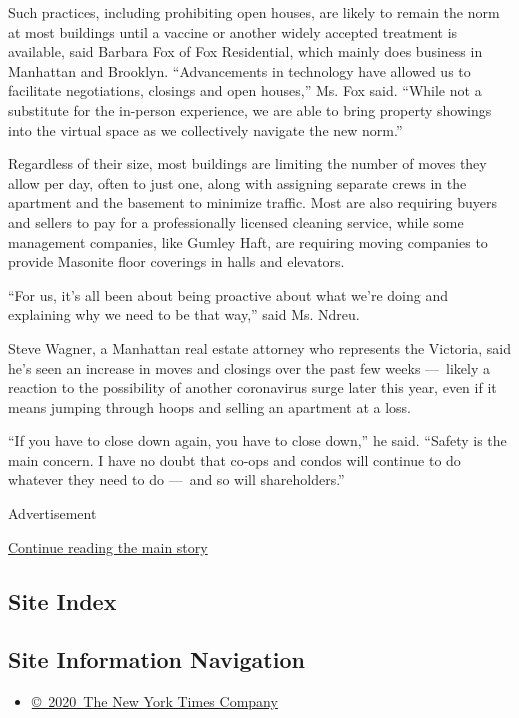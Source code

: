 Such practices, including prohibiting open houses, are likely to remain
the norm at most buildings until a vaccine or another widely accepted
treatment is available, said Barbara Fox of Fox Residential, which
mainly does business in Manhattan and Brooklyn. ``Advancements in
technology have allowed us to facilitate negotiations, closings and open
houses,'' Ms. Fox said. ``While not a substitute for the in-person
experience, we are able to bring property showings into the virtual
space as we collectively navigate the new norm.''

Regardless of their size, most buildings are limiting the number of
moves they allow per day, often to just one, along with assigning
separate crews in the apartment and the basement to minimize traffic.
Most are also requiring buyers and sellers to pay for a professionally
licensed cleaning service, while some management companies, like Gumley
Haft, are requiring moving companies to provide Masonite floor coverings
in halls and elevators.

``For us, it's all been about being proactive about what we're doing and
explaining why we need to be that way,'' said Ms. Ndreu.

Steve Wagner, a Manhattan real estate attorney who represents the
Victoria, said he's seen an increase in moves and closings over the past
few weeks ---~likely a reaction to the possibility of another
coronavirus surge later this year, even if it means jumping through
hoops and selling an apartment at a loss.

``If you have to close down again, you have to close down,'' he said.
``Safety is the main concern. I have no doubt that co-ops and condos
will continue to do whatever they need to do ---~and so will
shareholders.''

Advertisement

\protect\hyperlink{after-bottom}{Continue reading the main story}

\hypertarget{site-index}{%
\subsection{Site Index}\label{site-index}}

\hypertarget{site-information-navigation}{%
\subsection{Site Information
Navigation}\label{site-information-navigation}}

\begin{itemize}
\tightlist
\item
  \href{https://help.nytimes.com/hc/en-us/articles/115014792127-Copyright-notice}{©~2020~The
  New York Times Company}
\end{itemize}

